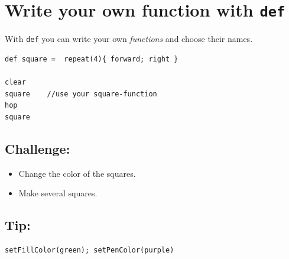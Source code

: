 \chapter{Write your own function with \lstinline{def}}With \lstinline{def} you can write your own {\it functions} and choose their names.

\begin{lstlisting}[basicstyle={\ttfamily\fontsize{20}{24}\selectfont},numbers=none]
def square =  repeat(4){ forward; right }  

clear
square    //use your square-function
hop
square
\end{lstlisting}
        
\section*{\color{BrickRed}Challenge:}


\begin{itemize}

\item {Change the color of the squares.}
\item {Make several squares.}

\end{itemize}


\section*{\color{OliveGreen}Tip:}

\begin{lstlisting}[numbers=none]
setFillColor(green); setPenColor(purple)
\end{lstlisting}
        
